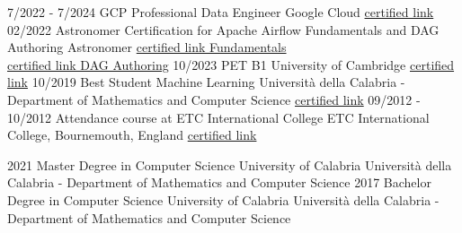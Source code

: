 \documentclass[9pt]{developercv} %
\begin{document}

    \vspace{-10 pt}
    \begin{entrylist}
        \entry
        {7/2022 - 7/2024}
        {GCP Professional Data Engineer }
        {Google Cloud}
        {\href{https://www.credential.net/470d1fe8-1a20-41af-961f-096835a17255}{certified link}}
        \entry
        {02/2022}
        {Astronomer Certification for Apache Airflow Fundamentals and DAG Authoring}
        {Astronomer}
        {\href{https://www.credly.com/badges/f424a105-4f82-4de6-91bf-70a299052e09/public_url}{certified link Fundamentals}\\
        \href{https://www.credly.com/badges/1f1da504-b57b-48d7-8072-fef4f4986b63/public_url}{certified link DAG Authoring}}
        \entry
        {10/2023}
        {PET B1}
        {University of Cambridge}
        {{\href{https://drive.google.com/file/d/1ovX9Wdp6UM7LHn44SEOdAeHrJC6N86qy/view?usp=sharing}{certified link}}}
        \entry
        {10/2019}
        {Best Student Machine Learning}
        {Università della Calabria - Department of Mathematics and Computer Science}
        {{\href{https://drive.google.com/file/d/1cmzZnOyi90RKBXiMnFjD5uF40IebOAa0/view?usp=sharing}{certified link}}}
        \entry
        {09/2012 - 10/2012}
        {Attendance course at ETC International College}
        {ETC International College, Bournemouth, England}
        {{\href{https://drive.google.com/file/d/1Ai58gPiwgB0o7BCikFwToqYFdmYi5bV2/view?usp=sharing}{certified link}}}
    \end{entrylist}
    \vspace{-10 pt}
    \begin{entrylist}
        \entry
        {2021}
        {Master Degree in Computer Science}
        {University of Calabria}
        {Università della Calabria - Department of Mathematics and Computer Science}
        \entry
        {2017}
        {Bachelor Degree in Computer Science}
        {University of Calabria}
        {Università della Calabria - Department of Mathematics and Computer Science}
    \end{entrylist}
\end{document}

